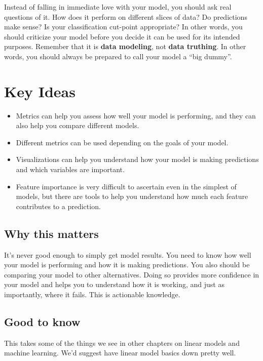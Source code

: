 \documentclass[
  letterpaper,
]{krantz}
\providecommand{\tightlist}{%
  \setlength{\itemsep}{0pt}\setlength{\parskip}{0pt}}\usepackage{longtable,booktabs,array}
\begin{document}
Instead of falling in immediate love with your model, you should ask
real questions of it. How does it perform on different slices of data?
Do predictions make sense? Is your classification cut-point appropriate?
In other words, you should criticize your model before you decide it can
be used for its intended purposes. Remember that it is \textbf{data
modeling}, not \textbf{data truthing}. In other words, you should always
be prepared to call your model a ``big dummy''.

\section{Key Ideas}\label{sec-knowing-key}

\begin{itemize}
\tightlist
\item
  Metrics can help you assess how well your model is performing, and
  they can also help you compare different models.
\item
  Different metrics can be used depending on the goals of your model.
\item
  Visualizations can help you understand how your model is making
  predictions and which variables are important.
\item
  Feature importance is very difficult to ascertain even in the simplest
  of models, but there are tools to help you understand how much each
  feature contributes to a prediction.
\end{itemize}

\subsection{Why this matters}\label{sec-knowing-why}

It's never good enough to simply get model results. You need to know how
well your model is performing and how it is making predictions. You also
should be comparing your model to other alternatives. Doing so provides
more confidence in your model and helps you to understand how it is
working, and just as importantly, where it fails. This is actionable
knowledge.

\subsection{Good to know}\label{sec-knowing-good}

This takes some of the things we see in other chapters on linear models
and machine learning. We'd suggest have linear model basics down pretty
well.
\end{document}
